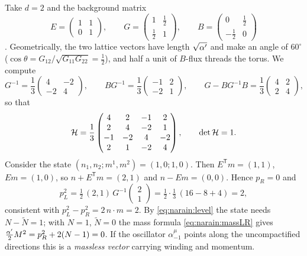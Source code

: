 \begin{example}\label{ex:narain:su3}
Take $d=2$ and the background matrix
\begin{equation}\label{eq:narain:su3E}
 E=\begin{pmatrix}1&1\\0&1\end{pmatrix},\qquad
 G=\begin{pmatrix}1&\frac12\\[1pt]\frac12&1\end{pmatrix},\qquad
 B=\begin{pmatrix}0&\frac12\\[1pt]-\frac12&0\end{pmatrix}
\end{equation}
. Geometrically, the two lattice vectors
have length $\sqrt{\alpha'}$ and make an angle of $60^\circ$ ($\cos\theta=G_{12}/\sqrt{G_{11}G_{22}}
=\frac12$), and half a unit of $B$-flux threads the torus. We compute
\[
 G^{-1}=\frac13\begin{pmatrix}4&-2\\-2&4\end{pmatrix},\qquad
 BG^{-1}=\frac13\begin{pmatrix}-1&2\\-2&1\end{pmatrix},\qquad
 G-BG^{-1}B=\frac13\begin{pmatrix}4&2\\2&4\end{pmatrix},
\]
so that
\begin{equation}
 \mathcal{H}=\frac13\begin{pmatrix}4&2&-1&2\\2&4&-2&1\\-1&-2&4&-2\\2&1&-2&4\end{pmatrix},
 \qquad\det\mathcal{H}=1 .
\end{equation}
Consider the state $(n_1,n_2;m^1,m^2)=(1,0;1,0)$. Then $E^{\mathsf T}m=(1,1)$, $Em=(1,0)$, so
$n+E^{\mathsf T}m=(2,1)$ and $n-Em=(0,0)$. Hence $p_R=0$ and
\[
 p_L^2=\tfrac12\,(2,1)\,G^{-1}\begin{pmatrix}2\\1\end{pmatrix}
 =\tfrac12\cdot\tfrac13\,(16-8+4)=2 ,
\]
consistent with $p_L^2-p_R^2=2\,n\cdot m=2$. By \eqref{eq:narain:level} the state needs
$N-\tilde N=1$; with $N=1$, $\tilde N=0$ the mass formula \eqref{eq:narain:massLR} gives
$\frac{\alpha'}2M^2=p_R^2+2(N-1)=0$. If the oscillator $\alpha^\mu_{-1}$ points along the
uncompactified directions this is a \emph{massless vector} carrying winding and momentum.


\end{example}
